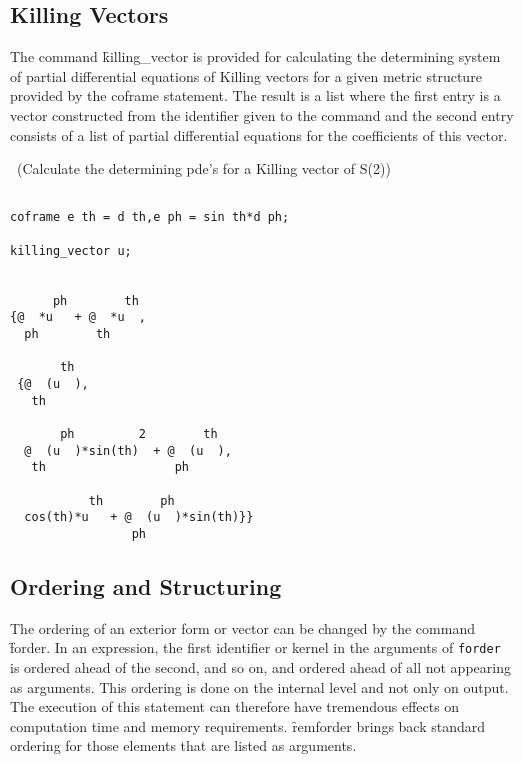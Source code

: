 \subsection{Killing Vectors}

The command \f{killing\_vector} is provided for calculating the
 \label{KILLING_VECTOR}
\hypertarget{command:KILLING_VECTOR}{}
determining system of partial differential equations of Killing vectors for
a given metric structure provided by the coframe statement.  The result is
a list where the first entry is a vector constructed from the identifier
given to the command and the second entry consists of a list of partial
differential equations for the coefficients of this vector.

\example\ (Calculate the determining pde's for a Killing vector of S(2))
\begin{verbatim}

coframe e th = d th,e ph = sin th*d ph;

killing_vector u;


      ph        th
{@  *u   + @  *u  ,
  ph        th

       th
 {@  (u  ),
   th

       ph         2        th
  @  (u  )*sin(th)  + @  (u  ),
   th                  ph

           th        ph
  cos(th)*u   + @  (u  )*sin(th)}}
                 ph

\end{verbatim}


\subsection{Ordering and Structuring}

 
\hypertarget{command:FORDER}{}
\hypertarget{command:REMFORDER}{}
The ordering of an exterior form or vector can be changed by the
command \f{forder}.\label{FORDER}  In an expression, the first
identifier or kernel in the arguments of \texttt{forder} is ordered ahead
of the second, and so on, and ordered ahead of all not appearing as
arguments.  This ordering is done on the internal level and not only
on output.  The execution of this statement can therefore have
tremendous effects on computation time and memory requirements.
\f{remforder}\label{REMFORDER} brings back standard ordering for those
elements that are listed as arguments. 

